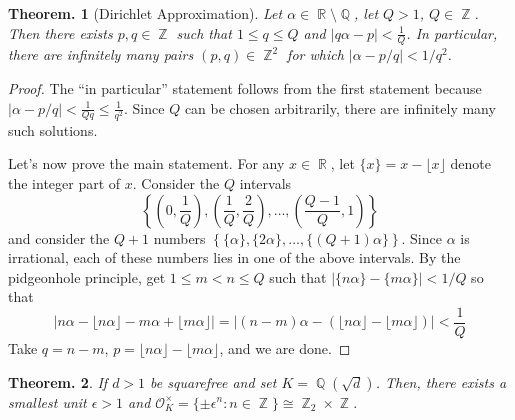 \documentclass[11pt, a4paper]{memoir}
\DeclareMathOperator{\Q}{{\mathbb{Q}}}
\DeclareMathOperator{\Z}{{\mathbb{Z}}}
\DeclareMathOperator{\R}{{\mathbb{R}}}
\theoremstyle{change}
\newtheorem{theorem}{Theorem.}[section]
\theoremstyle{plain}
\theoremstyle{nonumberplain}
\newtheorem{proof}{Proof}
\begin{document}
\begin{theorem}[Dirichlet Approximation]
    Let $\alpha\in\R\setminus\Q$, let $Q>1$, $Q\in\Z$.
    Then there exists $p,q\in\Z$ such that $1\leq q\leq Q$ and $|q\alpha-p|<\frac{1}{Q}$.
    In particular, there are infinitely many pairs $(p,q)\in\Z^2$ for which $|\alpha-p/q|<1/q^2$.
\end{theorem}
\begin{proof}
    The ``in particular'' statement follows from the first statement because $|\alpha-p/q|<\frac{1}{Qq}\leq\frac{1}{q^2}$.
    Since $Q$ can be chosen arbitrarily, there are infinitely many such solutions.

    Let's now prove the main statement.
    For any $x\in\R$, let $\{x\}=x-\lfloor x\rfloor$ denote the integer part of $x$.
    Consider the $Q$ intervals
    \begin{equation*}
        \left\{\left(0,\frac{1}{Q}\right),\left(\frac{1}{Q},\frac{2}{Q}\right),\ldots,\left(\frac{Q-1}{Q},1\right)\right\}
    \end{equation*}
    and consider the $Q+1$ numbers $\left\{\{\alpha\},\{2\alpha\},\ldots,\{(Q+1)\alpha\}\right\}$.
    Since $\alpha$ is irrational, each of these numbers lies in one of the above intervals.
    By the pidgeonhole principle, get $1\leq m<n\leq Q$ such that $|\{n\alpha\}-\{m\alpha\}|<1/Q$ so that
    \begin{equation*}
        \left\lvert n\alpha-\lfloor n\alpha\rfloor-m\alpha+\lfloor m\alpha\rfloor\right\rvert=\left\lvert(n-m)\alpha-(\lfloor n\alpha\rfloor-\lfloor m\alpha\rfloor)\right\rvert<\frac{1}{Q}
    \end{equation*}
    Take $q=n-m$, $p=\lfloor n\alpha\rfloor-\lfloor m\alpha\rfloor$, and we are done.
\end{proof}
\begin{theorem}
    If $d>1$ be squarefree and set $K=\Q(\sqrt{d})$.
    Then, there exists a smallest unit $\epsilon>1$ and $\mathcal{O}_K^\times=\{\pm\epsilon^n:n\in\Z\}\cong \Z_2\times\Z$.
\end{theorem}
\end{document}
